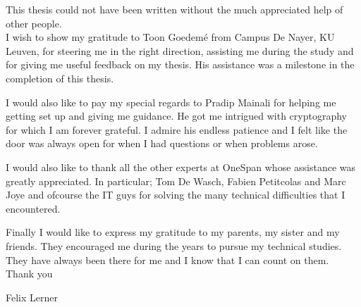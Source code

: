 This thesis could not have been written without the much appreciated help of other people.\\

I wish to show my gratitude to Toon Goedem{\'e} from Campus De Nayer, KU Leuven, for steering me in the right direction, assisting me during the study and for giving me useful feedback on my thesis. His assistance was a milestone in the completion of this thesis.

I would also like to pay my special regards to Pradip Mainali for helping me getting set up and giving me guidance. He got me intrigued with cryptography for which I am forever grateful. I admire his endless patience and I felt like the door was always open for when I had questions or when problems arose.

 I would also like to thank all the other experts at OneSpan whose assistance was greatly appreciated. In particular; Tom De Wasch, Fabien Petitcolas and Marc Joye and ofcourse the IT guys for solving the many technical difficulties that I encountered.

Finally I would like to express my gratitude to my parents, my sister and my friends. They encouraged me during the years to pursue my technical studies. They have always been there for me and I know that I can count on them.\\

Thank you

Felix Lerner
